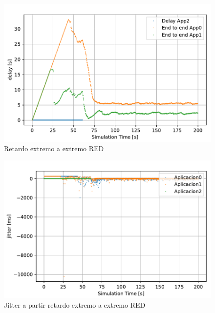 \begin{figure}[!ht]
    \centering
    \includegraphics{graficas/RED/delay_red.pdf}
    \caption{Retardo extremo a extremo RED}
    \label{fig:sinqos_pktreceived99100}
\end{figure}

\begin{figure}
    \centering
    \includegraphics{graficas/RED/jitter_RED.pdf}
    \caption{Jitter a partir retardo extremo a extremo RED}
    \label{fig:sinqos_pktreceived99100}
\end{figure}

